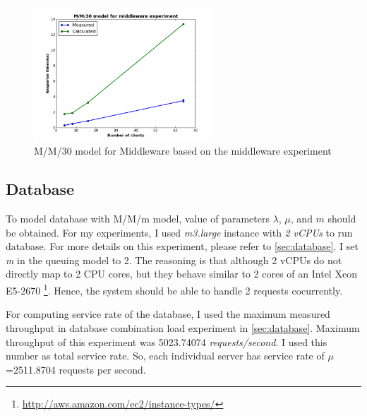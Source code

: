 \documentclass[11pt]{article}
\begin{document}
\begin{figure}[H]
  \includegraphics[width=0.6\textwidth,page=1]{figures/mmm/mmm-middleware}
  \centering
  \caption{M/M/30 model for Middleware based on the middleware experiment \cite[section~1.2.4]{ms1}}
  \label{fig:mmm-middleware}
\end{figure}


\subsection{Database}
\label{sec:report-database}

To model database with M/M/m model, value of parameters $\lambda$, $\mu$, and $m$ should be obtained. 
For my experiments, I used \emph{m3.large} instance with \emph{2} \emph{vCPUs} to run 
database. For more details on this experiment, please refer to \cref{sec:database}.
I set \emph{m} in the queuing model to 2. The reasoning is that although 2 vCPUs do not 
directly map to 2 CPU cores, but they behave similar to 2 cores of an Intel Xeon E5-2670 
\footnote{\url{http://aws.amazon.com/ec2/instance-types/}}. Hence, the system should be able to 
handle 2 requests cocurrently.

For computing service rate of the database, I used the maximum measured throughput in database combination load 
experiment in \cref{sec:database}. Maximum throughput of this experiment was 5023.74074 \emph{requests/second}. I used this number as total
service rate. So, each individual server has service rate of $\mu$=2511.8704 requests per second.
\end{document}
